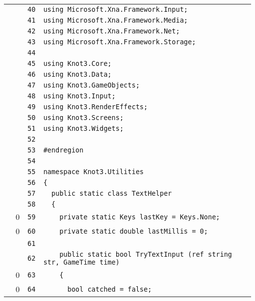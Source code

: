 \documentclass[a4paper,10pt]{article}
\begin{document}
\begin{longtable}[l]{lrrl}
\cellcolor{gray} &  & \verb~40~ & \verb~using Microsoft.Xna.Framework.Input;~\\
\cellcolor{gray} &  & \verb~41~ & \verb~using Microsoft.Xna.Framework.Media;~\\
\cellcolor{gray} &  & \verb~42~ & \verb~using Microsoft.Xna.Framework.Net;~\\
\cellcolor{gray} &  & \verb~43~ & \verb~using Microsoft.Xna.Framework.Storage;~\\
\cellcolor{gray} &  & \verb~44~ & \verb~~\\
\cellcolor{gray} &  & \verb~45~ & \verb~using Knot3.Core;~\\
\cellcolor{gray} &  & \verb~46~ & \verb~using Knot3.Data;~\\
\cellcolor{gray} &  & \verb~47~ & \verb~using Knot3.GameObjects;~\\
\cellcolor{gray} &  & \verb~48~ & \verb~using Knot3.Input;~\\
\cellcolor{gray} &  & \verb~49~ & \verb~using Knot3.RenderEffects;~\\
\cellcolor{gray} &  & \verb~50~ & \verb~using Knot3.Screens;~\\
\cellcolor{gray} &  & \verb~51~ & \verb~using Knot3.Widgets;~\\
\cellcolor{gray} &  & \verb~52~ & \verb~~\\
\cellcolor{gray} &  & \verb~53~ & \verb~#endregion~\\
\cellcolor{gray} &  & \verb~54~ & \verb~~\\
\cellcolor{gray} &  & \verb~55~ & \verb~namespace Knot3.Utilities~\\
\cellcolor{gray} &  & \verb~56~ & \verb~{~\\
\cellcolor{gray} &  & \verb~57~ & \verb~  public static class TextHelper~\\
\cellcolor{gray} &  & \verb~58~ & \verb~  {~\\
\cellcolor{red} & 0 & \verb~59~ & \verb~    private static Keys lastKey = Keys.None;~\\
\cellcolor{red} & 0 & \verb~60~ & \verb~    private static double lastMillis = 0;~\\
\cellcolor{gray} &  & \verb~61~ & \verb~~\\
\cellcolor{gray} &  & \verb~62~ & \verb~    public static bool TryTextInput (ref string str, GameTime time)~\\
\cellcolor{red} & 0 & \verb~63~ & \verb~    {~\\
\cellcolor{red} & 0 & \verb~64~ & \verb~      bool catched = false;~\\

\end{longtable}
\end{document}

